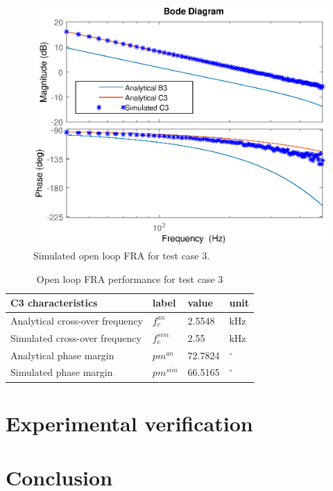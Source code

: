 \documentclass[journal]{IEEEtran}
\begin{document}
\begin{figure}[t!]
    \centerline{\includegraphics[width=0.95\linewidth]{figures/tc3_olfra.eps}}
    \caption{Simulated open loop FRA  for test case 3.}
    \label{fig:tc3_olfra} 
\end{figure}

\begin{table}[h!]
			  \caption{Open loop FRA performance for test case 3}
              \label{tab:tc3_olfra}
              \centering
              \begin{tabular}{llll}
                           \midrule\midrule
        C3 characteristics & label & value   & unit\\
        \midrule               
                  Analytical cross-over frequency	& $f_{c}^{an}$ & 2.5548 &kHz\\
                  Simulated cross-over frequency	& $f_{c}^{sim}$ & 2.55 &kHz\\ 
                  Analytical phase margin  & $pm^{an}$ & 72.7824 &  $^\circ$   \\
                  Simulated phase margin  & $pm^{sim}$ & 66.5165 &  $^\circ$   \\
                  \midrule\midrule
                                                        
              \end{tabular}
\end{table}

\section{Experimental verification}

\section{Conclusion}


\ifCLASSOPTIONcaptionsoff
  \newpage
\fi



\end{document}
